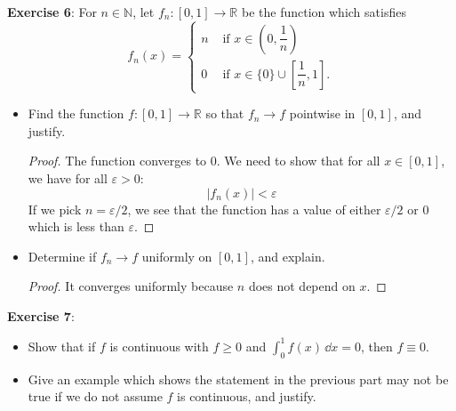 \documentclass{article}
\begin{document}
\textbf{Exercise 6}: For $n \in\mathbb{N}$, let $f_{n} : [0, 1] \rightarrow \mathbb{R}$ be the function which satisfies 
    \begin{equation*}
        f_{n}(x) = \begin{cases}
            n                                   &\text{ if } x \in(0, \dfrac{1}{n}) \\
            0 &\text{ if } x \in \{0\} \cup [\dfrac{1}{n}, 1].   
        \end{cases}
    \end{equation*}
    \begin{itemize}
        \item Find the function $f : [0 , 1] \rightarrow \mathbb{R}$ so that $f_{n} \rightarrow f$ pointwise in $[0, 1]$, and justify.
            \begin{proof}
                The function converges to $0$. We need to show that for all $x \in [0, 1]$, we have for all $\varepsilon > 0$:
                    \begin{equation*}
                        \lvert f_{n}(x) \rvert < \varepsilon
                    \end{equation*}
                If we pick $n = \varepsilon/2$, we see that the function has a value of either $\varepsilon/2$ or $0$ which is less than $\varepsilon$.
            \end{proof}

        \item Determine if $f_{n} \rightarrow f$ uniformly on $[0, 1]$, and explain.
            \begin{proof}
                It converges uniformly because $n$ does not depend on $x$.
            \end{proof}
    \end{itemize}

\textbf{Exercise 7}:
    \begin{itemize}
        \item Show that if $f$ is continuous with $f \geq0$ and $\int_{0}^{1} f(x) \, \dd{x}  = 0$, then $f \equiv 0$.

        \item Give an example which shows the statement in the previous part may not be true if we do not assume $f$ is continuous, and justify. 
    \end{itemize}
\end{document}
